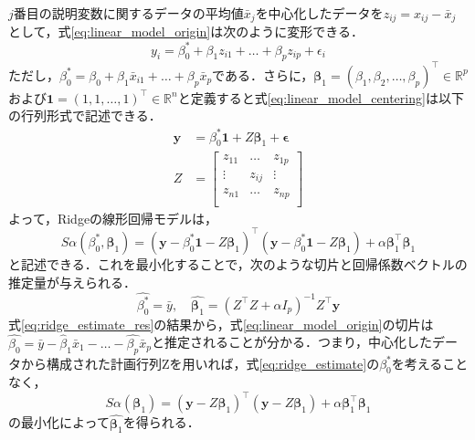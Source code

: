 \documentclass[a4paper,twocolumn]{ujarticle} %
\begin{document}
$j$番目の説明変数に関するデータの平均値$\bar{x}_j$を中心化したデータを$z_{ij}=x_{ij} - \bar{x}_j$として，式\eqref{eq:linear_model_origin}は次のように変形できる．
\begin{equation}
        y_i = \beta_0^* + \beta_1 z_{i1} + \dots + \beta_p z_{ip} + \epsilon_i
	\label{eq:linear_model_centering}
\end{equation}
ただし，$\beta_0^* = \beta_0 + \beta_1 \bar{x}_{i1} + \dots + \beta_p \bar{x}_{p}$である．さらに，$\bm{\beta}_1 = (\beta_1, \beta_2, \dots , \beta_p)^{\top} \in \mathbb{R}^p$および$ \bm{1} = (1, 1, \dots , 1)^{\top} \in \mathbb{R}^n$と定義すると式\eqref{eq:linear_model_centering}は以下の行列形式で記述できる．
\begin{equation}
	\begin{split}
		\bm{y} &= \beta_0^* \bm{1} + Z \bm{\beta}_1 + \bm{\epsilon}\\
		Z &= \left[
                \begin{array}{ccc}
                z_{11} & \dots & z_{1p} \\
                \vdots & z_{ij} & \vdots \\
                z_{n1} & \dots & z_{np} \\
                \end{array}
                \right]
        \end{split}
	\label{eq:linear_model_mat}
\end{equation}
よって，Ridgeの線形回帰モデルは，
\begin{equation}
	S\alpha(\beta_0^* , \bm{\beta}_1) = (\bm{y} - \beta_0^* \bm{1} - Z \bm{\beta}_1)^{\top} (\bm{y} - \beta_0^* \bm{1} - Z \bm{\beta}_1) + \alpha \bm{\beta}_1^{\top} \bm{\beta}_1 
	\label{eq:ridge_estimate}
\end{equation}
と記述できる．これを最小化することで，次のような切片と回帰係数ベクトルの推定量が与えられる．
\begin{equation}
	\hat{\beta_0^*} = \bar{y}, \quad \hat{\bm{\beta}_1} = (Z^{\top}Z + \alpha I_p)^{-1} Z^{\top} \bm{y}
	\label{eq:ridge_estimate_res}
\end{equation}
式\eqref{eq:ridge_estimate_res}の結果から，式\eqref{eq:linear_model_origin}の切片は$\hat{\beta_0} = \bar{y} - \hat{\beta}_1 \bar{x}_1 - \dots - \hat{\beta_p} \bar{x}_p$と推定されることが分かる．つまり，中心化したデータから構成された計画行列Zを用いれば，式\eqref{eq:ridge_estimate}の$\beta_0^*$を考えることなく，
\begin{equation}
	S\alpha(\bm{\beta}_1) = (\bm{y} - Z \bm{\beta}_1)^{\top}  (\bm{y} - Z\bm{\beta}_1) + \alpha \bm{\beta}_1^{\top} \bm{\beta}_1
	\label{eq:ridge_estimate_beta1hat}
\end{equation}
の最小化によって$\hat{\bm{\beta}_1}$を得られる．
\end{document}

